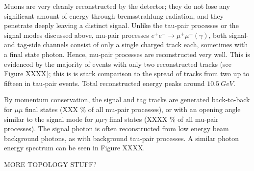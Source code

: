 \documentclass[12pt]{thesis}  %
\begin{document}
Muons are very cleanly reconstructed by the detector; they do not lose any significant amount of energy through bremsstrahlung radiation, and they penetrate deeply leaving a distinct signal. Unlike the tau-pair processes or the signal modes discussed above, mu-pair processes $e^+ e^- \to \mu^+ \mu^- (\gamma)$, both signal- and tag-side channels consist of only a single charged track each, sometimes with a final state photon. Hence, mu-pair processes are reconstructed very well. This is evidenced by the majority of events with only two reconstructed tracks (see Figure XXXX); this is is stark comparison to the spread of tracks from two up to fifteen in tau-pair events. Total reconstructed energy peaks around $\SI{10.5}{GeV}$.

By momentum conservation, the signal and tag tracks are generated back-to-back for $\mu\mu$ final states (XXX \% of all mu-pair processes), or with an opening angle similar to the signal mode for $\mu\mu\gamma$ final states (XXXX \% of all mu-pair processes). The signal photon is often reconstructed from low energy beam background photons, as with background tau-pair processes. A similar photon energy spectrum can be seen in Figure XXXX.

MORE TOPOLOGY STUFF?
\end{document}

